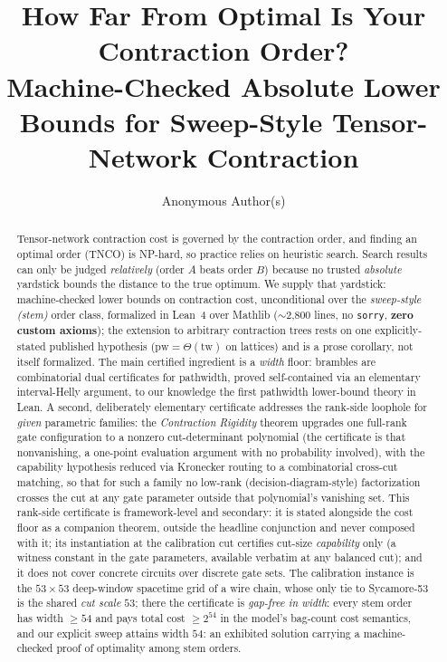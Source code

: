 \documentclass[sigplan,10pt,screen,review,anonymous]{acmart}
\newcommand{\pw}{\mathrm{pw}}
\newcommand{\tw}{\mathrm{tw}}
\begin{document}
\title{How Far From Optimal Is Your Contraction Order?\\
       Machine-Checked Absolute Lower Bounds for Sweep-Style Tensor-Network Contraction}

\author{Anonymous Author(s)}

\begin{abstract}
Tensor-network contraction cost is governed by the contraction order, and finding an
optimal order (TNCO) is NP-hard, so practice relies on heuristic search. Search results
can only be judged \emph{relatively} (order $A$ beats order $B$) because no trusted
\emph{absolute} yardstick bounds the distance to the true optimum. We supply
that yardstick: machine-checked lower bounds on contraction cost, unconditional over the
\emph{sweep-style (stem)} order class, formalized in
Lean~4 over Mathlib ($\sim$2{,}800 lines, no \texttt{sorry}, \textbf{zero custom axioms});
the extension to arbitrary contraction trees rests on one explicitly-stated published
hypothesis ($\pw = \Theta(\tw)$ on lattices) and is a prose corollary, not itself formalized.
The main certified ingredient is a \emph{width} floor: brambles are combinatorial dual
certificates for pathwidth, proved self-contained via an elementary interval-Helly argument,
to our knowledge the first pathwidth lower-bound theory in Lean. A second, deliberately
elementary certificate addresses the rank-side loophole for \emph{given} parametric
families: the \emph{Contraction Rigidity} theorem
upgrades one full-rank gate configuration to a nonzero cut-determinant polynomial (the
certificate is that nonvanishing, a one-point evaluation argument with no probability
involved), with the capability
hypothesis reduced via Kronecker routing to a combinatorial cross-cut matching, so that for
such a family no low-rank (decision-diagram-style) factorization crosses the cut at any gate
parameter outside that polynomial's vanishing set. This rank-side certificate is
framework-level and secondary: it is stated alongside the cost floor as a companion theorem,
outside the headline conjunction and never composed with it; its
instantiation at the calibration cut certifies cut-size \emph{capability} only (a witness
constant in the gate parameters, available verbatim at any balanced cut); and it does not
cover concrete circuits over discrete gate sets. The calibration instance is the $53\times53$ deep-window spacetime
grid of a wire chain, whose only tie to Sycamore-53 is the shared \emph{cut scale} $53$;
there the certificate is \emph{gap-free in width}: every stem order has width $\ge 54$ and pays
total cost $\ge 2^{54}$ in the model's bag-count cost semantics, and our explicit sweep
attains width $54$: an exhibited solution carrying a machine-checked proof of optimality
among stem orders.
\end{abstract}
\end{document}
